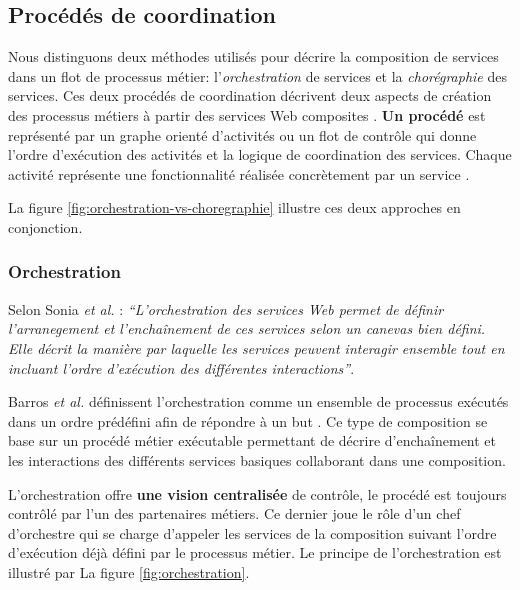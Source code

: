     \subsection{Procédés de coordination}
    \label{sec:proc-de-coord}
    Nous distinguons deux méthodes utilisés pour décrire la
    composition de services dans un flot de processus métier:
    l'\emph{orchestration} de services et la \emph{chorégraphie} des
    services. Ces deux procédés de coordination décrivent deux aspects
    de création des processus métiers à partir des services Web
    composites \cite{peltz2003web}.
    \textbf{Un procédé} est représenté par un graphe orienté
    d'activités ou un flot de contrôle qui donne l'ordre d'exécution
    des activités et la logique de coordination des services. Chaque
    activité représente une fonctionnalité réalisée concrètement par
    un service \cite{chollet2009orchestration}.

    La figure \ref{fig:orchestration-vs-choregraphie} illustre ces
    deux approches en conjonction.
           

      \subsubsection{Orchestration}
      \label{sec:orchestration-sec}
      Selon Sonia \emph{et al.} \cite{jamal2005environnement}:
      \emph{``L'orchestration des services Web permet de définir
        l'arranegement et l'enchaînement de ces services selon un
        canevas bien défini. Elle décrit la manière par laquelle les
        services peuvent interagir ensemble tout en incluant l'ordre
        d'exécution des différentes interactions''}.

      Barros \emph{et al.} \cite{barros2006standards} définissent
      l'orchestration comme un ensemble de processus exécutés dans un
      ordre prédéfini afin de répondre à un but
      \cite{lopez2008selection}. Ce type de composition se base sur un
      procédé métier exécutable permettant de décrire d'enchaînement
      et les interactions des différents services basiques collaborant
      dans une composition.
      
      L'orchestration offre \textbf{une vision centralisée} de
      contrôle, le procédé est toujours contrôlé par l'un des
      partenaires métiers. Ce dernier joue le rôle d'un chef
      d'orchestre qui se charge d'appeler les services de la
      composition suivant l'ordre d'exécution déjà défini par le
      processus métier. Le principe de l'orchestration est illustré
      par La figure \ref{fig:orchestration}.

